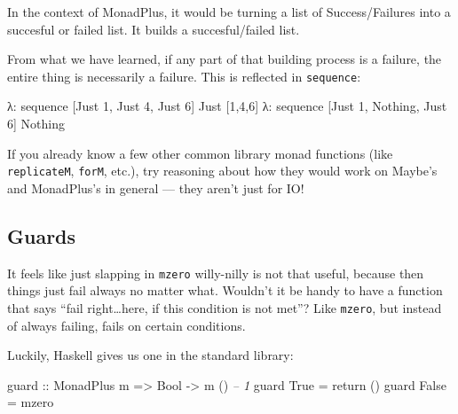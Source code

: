 \documentclass[]{article}
\newenvironment{Shaded}{}{}
\newcommand{\DataTypeTok}[1]{\textcolor[rgb]{0.56,0.13,0.00}{{#1}}}
\newcommand{\DecValTok}[1]{\textcolor[rgb]{0.25,0.63,0.44}{{#1}}}
\newcommand{\CommentTok}[1]{\textcolor[rgb]{0.38,0.63,0.69}{\textit{{#1}}}}
\newcommand{\OtherTok}[1]{\textcolor[rgb]{0.00,0.44,0.13}{{#1}}}
\newcommand{\FunctionTok}[1]{\textcolor[rgb]{0.02,0.16,0.49}{{#1}}}
\newcommand{\NormalTok}[1]{{#1}}
\begin{document}
In the context of MonadPlus, it would be turning a list of Success/Failures into a succesful or
failed list. It builds a succesful/failed list.

From what we have learned, if any part of that building process is a failure, the entire thing is
necessarily a failure. This is reflected in \texttt{sequence}:

\begin{Shaded}
\begin{Highlighting}[]
\NormalTok{λ}\FunctionTok{:} \NormalTok{sequence [}\DataTypeTok{Just} \DecValTok{1}\NormalTok{, }\DataTypeTok{Just} \DecValTok{4}\NormalTok{, }\DataTypeTok{Just} \DecValTok{6}\NormalTok{]}
\DataTypeTok{Just} \NormalTok{[}\DecValTok{1}\NormalTok{,}\DecValTok{4}\NormalTok{,}\DecValTok{6}\NormalTok{]}
\NormalTok{λ}\FunctionTok{:} \NormalTok{sequence [}\DataTypeTok{Just} \DecValTok{1}\NormalTok{, }\DataTypeTok{Nothing}\NormalTok{, }\DataTypeTok{Just} \DecValTok{6}\NormalTok{]}
\DataTypeTok{Nothing}
\end{Highlighting}
\end{Shaded}

If you already know a few other common library monad functions (like \texttt{replicateM},
\texttt{forM}, etc.), try reasoning about how they would work on Maybe's and MonadPlus's in general
--- they aren't just for IO!

\subsection{Guards}\label{guards}

It feels like just slapping in \texttt{mzero} willy-nilly is not that useful, because then things
just fail always no matter what. Wouldn't it be handy to have a function that says ``fail
right\ldots{}here, if this condition is not met''? Like \texttt{mzero}, but instead of always
failing, fails on certain conditions.

Luckily, Haskell gives us one in the standard library:

\begin{Shaded}
\begin{Highlighting}[]
\OtherTok{guard ::} \DataTypeTok{MonadPlus} \NormalTok{m }\OtherTok{=>} \DataTypeTok{Bool} \OtherTok{->} \NormalTok{m ()        }\CommentTok{-- 1}
\NormalTok{guard }\DataTypeTok{True}  \FunctionTok{=} \NormalTok{return ()}
\NormalTok{guard }\DataTypeTok{False} \FunctionTok{=} \NormalTok{mzero}
\end{Highlighting}
\end{Shaded}
\end{document}
